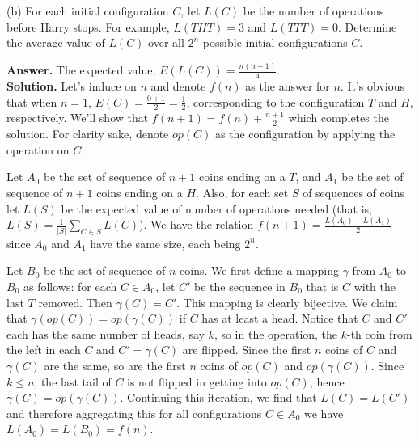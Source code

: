 \documentclass[11pt,a4paper]{article}
\newcommand{\<}{\langle}
\renewcommand{\>}{\rangle}
\newcommand{\dsum}{\displaystyle\sum}
\begin{document}
\begin{enumerate}
	(b) For each initial configuration $C$, let $L(C)$ be the number of operations before Harry stops. For example, $L(THT) = 3$ and $L(TTT) = 0$. Determine the average value of $L(C)$ over all $2^n$ possible initial configurations $C$.
	
	\textbf{Answer.} The expected value, $E(L(C))=\frac{n(n+1)}{4}$. \\
	\textbf{Solution.} Let's induce on $n$ and denote $f(n)$ as the answer for $n$. It's obvious that when $n=1$, $E(C)=\frac{0+1}{2}=\frac 12$, corresponding to the configuration $T$ and $H$, respectively. We'll show that $f(n+1)=f(n)+\frac{n+1}{2}$ which completes the solution. 
	For clarity sake, denote $op(C)$ as the configuration by applying the operation on $C$. 
	
	Let $A_0$ be the set of sequence of $n+1$ coins ending on a $T$, and $A_1$ be the set of sequence of $n+1$ coins ending on a $H$. Also, for each set $S$ of sequences of coins let $L(S)$ be the expected value of number of operations needed (that is, $L(S)=\frac{1}{|S|}\dsum_{C\in S}L(C)$). 
	We have the relation $f(n+1)=\frac{L(A_0)+L(A_1)}{2}$ since $A_0$ and $A_1$ have the same size, each being $2^n$. 
	
	Let $B_0$ be the set of sequence of $n$ coins. We first define a mapping $\gamma$ from $A_0$ to $B_0$ as follows: for each $C\in A_0$, let $C'$ be the sequence in $B_0$ that is $C$ with the last $T$ removed. Then $\gamma(C)=C'$. This mapping is clearly bijective. We claim that $\gamma(op(C))=op(\gamma(C))$ if $C$ has at least a head. Notice that $C$ and $C'$ each has the same number of heads, say $k$, so in the operation, the $k$-th coin from the left in each $C$ and $C'=\gamma(C)$ are flipped. 
	Since the first $n$ coins of $C$ and $\gamma(C)$ are the same, so are the first $n$ coins of $op(C)$ and $op(\gamma(C))$. Since $k\le n$, the last tail of $C$ is not flipped in getting into $op(C)$, hence $\gamma(C)=op(\gamma(C))$. 
	Continuing this iteration, we find that $L(C)=L(C')$ and therefore aggregating this for all configurations $C\in A_0$ we have $L(A_0)=L(B_0)=f(n)$. 
	

\end{enumerate}
\end{document}
